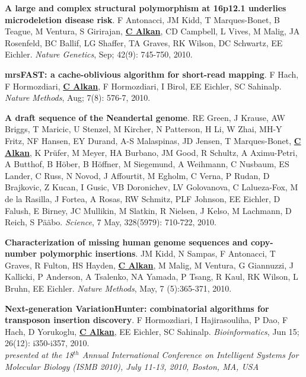 \vspace{-.2cm}
{\bf A large and complex structural polymorphism at 16p12.1 underlies microdeletion disease risk}. F Antonacci, JM Kidd,
 T Marques-Bonet, B Teague, M Ventura, S Girirajan, {\bf {\underline {C Alkan}}}, CD Campbell, L Vives, M Malig, 
JA Rosenfeld, BC Ballif, LG Shaffer, TA Graves, RK Wilson, DC Schwartz, EE Eichler. {\em Nature 
Genetics}, Sep; 42(9): 745-750, 2010.

\vspace{-.2cm}
{\bf mrsFAST: a cache-oblivious algorithm for short-read mapping}. F  Hach,  F Hormozdiari, {\bf {\underline {C Alkan}}}, F Hormozdiari,
 I Birol,  EE Eichler, SC Sahinalp. {\em Nature Methods}, Aug; 7(8): 576-7, 2010.



\vspace{-.2cm}
 {\bf A draft sequence of the Neandertal genome}. RE Green, J Krause, 
AW Briggs, T Maricic, U Stenzel, M Kircher, N Patterson, 
H Li, W Zhai, MH-Y Fritz, NF Hansen, EY Durand, 
A-S Malaspinas, JD Jensen, T Marques-Bonet, {\bf {\underline {C Alkan}}}, K Pr\"{u}fer, M Meyer, HA Burbano, JM Good, R Schultz, A Aximu-Petri, 
A Butthof, B H\"{o}ber, B H\"{o}ffner, M Siegemund, A Weihmann, C
Nusbaum, ES Lander, C Russ, N Novod, J Affourtit, M Egholm, 
C Verna, P Rudan, D Brajkovic, Z Kucan, I Gusic, VB 
Doronichev, LV Golovanova, C Lalueza-Fox, M de la Rasilla, J Fortea, 
A Rosas, RW Schmitz, PLF Johnson, EE Eichler, D Falush, E 
Birney, JC Mullikin, M Slatkin, R Nielsen, J Kelso, M Lachmann, 
D Reich, S P\"{a}\"{a}bo. {\em Science}, 7 May, 328(5979): 710-722, 2010. \\


\vspace{-.2cm}
{\bf Characterization of missing human genome sequences and
copy-number polymorphic insertions}.
JM Kidd, N Sampas, F Antonacci, T Graves, R Fulton, HS Hayden, {\bf {\underline{C Alkan}}},
 M Malig, M Ventura, G Giannuzzi, J Kallicki, P Anderson, A Tsalenko, 
NA Yamada, P Tsang, R Kaul, RK Wilson, L Bruhn, EE Eichler.
{\em Nature Methods}, May, 7 (5):365-371, 2010.


\vspace{-.2cm}
{\bf Next-generation VariationHunter: combinatorial algorithms for transposon insertion discovery}.
F Hormozdiari, I Hajirasouliha, P Dao, F Hach, D Yorukoglu, {\bf {\underline{C Alkan}}},
 EE Eichler, SC Sahinalp.
{\em Bioinformatics}, Jun 15; 26(12): i350-i357, 2010. \\
\hspace*{1cm} {\footnotesize {\em presented at the 18$^{th}$ Annual International Conference on Intelligent Systems
for Molecular Biology (ISMB 2010), July 11-13, 2010, Boston, MA, USA}}


